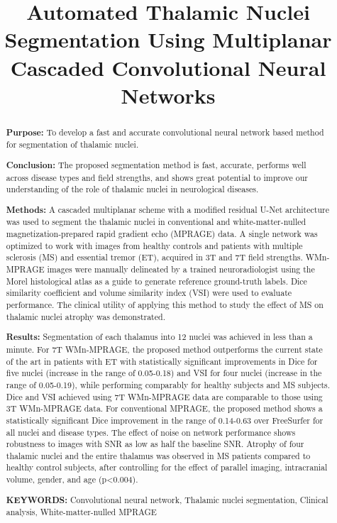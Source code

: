 \documentclass[3p,,final,12pt]{elsarticle}
\begin{document}
\title{Automated Thalamic Nuclei Segmentation Using Multiplanar Cascaded Convolutional Neural Networks}

\begin{abstract}
\textbf{Purpose:} To develop a fast and accurate convolutional neural network based method for segmentation of thalamic nuclei.

\textbf{Conclusion:} The proposed segmentation method is fast, accurate, performs well across disease types and field strengths, and shows great potential to improve our understanding of the role of thalamic nuclei in neurological diseases. 

\textbf{Methods:} A cascaded multiplanar scheme with a modified residual U-Net architecture was used to segment the thalamic nuclei in conventional and white-matter-nulled magnetization-prepared rapid gradient echo (MPRAGE) data. A single network was optimized to work with images from healthy controls and patients with multiple sclerosis (MS) and essential tremor (ET), acquired in 3T and 7T field strengths. WMn-MPRAGE images were manually delineated by a trained neuroradiologist using the Morel histological atlas as a guide to generate reference ground-truth labels. Dice similarity coefficient and volume similarity index (VSI) were used to evaluate performance. The clinical utility of applying this method to study the effect of MS on thalamic nuclei atrophy was demonstrated. 

\textbf{Results:} Segmentation of each thalamus into 12 nuclei was achieved in less than a minute. For 7T WMn-MPRAGE, the proposed method outperforms the current state of the art in patients with ET with statistically significant improvements in Dice for five nuclei (increase in the range of 0.05-0.18) and VSI for four nuclei (increase in the range of 0.05-0.19), while performing comparably for healthy subjects and MS subjects. Dice and VSI achieved using 7T WMn-MPRAGE data are comparable to those using 3T WMn-MPRAGE data. For conventional MPRAGE, the proposed method shows a statistically significant Dice improvement in the range of 0.14-0.63 over FreeSurfer for all nuclei and disease types. The effect of noise on network performance shows robustness to images with SNR as low as half the baseline SNR. Atrophy of four thalamic nuclei and the entire thalamus was observed in MS patients compared to healthy control subjects, after controlling for the effect of parallel imaging, intracranial volume, gender, and age (p{\textless}0.004).

\textbf{KEYWORDS:} Convolutional neural network, Thalamic nuclei segmentation, Clinical analysis, White-matter-nulled MPRAGE
\end{abstract}
\end{document}
